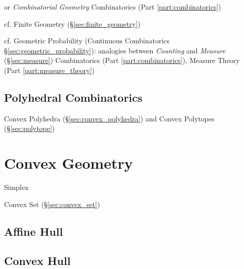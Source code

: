 or \emph{Combinatorial Geometry} \fist Combinatorics (Part
\ref{part:combinatorics})

cf. Finite Geometry (\S\ref{sec:finite_geometry})

\fist cf. Geometric Probability (Continuous Combinatorics
\S\ref{sec:geometric_probability}): analogies between \emph{Counting} and
\emph{Measure} (\S\ref{sec:measure}) \fist Combinatorics (Part
\ref{part:combinatorics}), Measure Theory (Part \ref{part:measure_theory})



\subsection{Polyhedral Combinatorics}\label{sec:polyhedral_combinatorics}

Convex Polyhedra (\S\ref{sec:convex_polyhedra}) and Convex Polytopes
(\S\ref{sec:polytope})



\section{Convex Geometry}\label{sec:convex_geometry}


Simplex

Convex Set (\S\ref{sec:convex_set})



\subsection{Affine Hull}\label{sec:affine_hull}

\subsection{Convex Hull}\label{sec:convex_hull}

